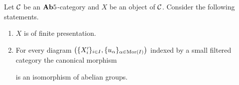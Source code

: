 \begin{theorem}\label{theorem:finitelypresentedandfilteredcolimits}
Let ${\mathcal C}$ be an $\mathbf{Ab}5$-category and $X$ be an object of ${\mathcal C}$. Consider the following statements.
\begin{enumerate}[label=\emph{\textbf{(\roman*)}}, leftmargin=3.0em]
\item $X$ is of finite presentation.
\item For every diagram $\left(\{X'_i\}_{i\in I},\{u_{\alpha}\}_{\alpha \in \mathrm{Mor}(I)}\right)$ indexed by a small filtered category the canonical morphism
\begin{center}
\end{center}
is an isomorphism of abelian groups.
\end{enumerate} 
\end{theorem}
